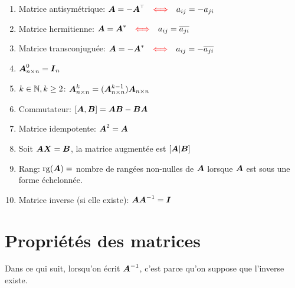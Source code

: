 \begin{adjmulticols}{1}{0in}{-2in}
\begin{enumerate}
\item Matrice antisymétrique: $\matA = -\transp{\matA}\quad{\color{red}\Longleftrightarrow}\quad a_{ij} = -a_{ji}$
\item Matrice hermitienne: $\boldsymbol{A} = \boldsymbol{A}^* \quad{\color{red}\Longleftrightarrow}\quad a_{ij} = \overline{a_{ji}}$
\item Matrice transconjuguée: $\boldsymbol{A} = -\boldsymbol{A}^* \quad{\color{red}\Longleftrightarrow}\quad a_{ij} = -\overline{a_{ji}}$
\item $\boldsymbol{A}_{n\times n}^0 = \boldsymbol{I}_n$
\item $k\in\mathbb{N}, k \geq 2$: \quad $\boldsymbol{A}^k_{n\times n} = (\boldsymbol{A}_{n\times n}^{k-1}) \boldsymbol{A}_{n\times n}$
\item Commutateur: $[\boldsymbol{A}, \boldsymbol{B}] = \boldsymbol{A}\boldsymbol{B} - \boldsymbol{B}\boldsymbol{A}$
\item Matrice idempotente: $\boldsymbol{A}^2 = \boldsymbol{A}$
\item Soit $\boldsymbol{A}\boldsymbol{X} = \boldsymbol{B}$, la matrice augmentée est $[\boldsymbol{A} |\boldsymbol{B}]$
\item Rang: $\operatorname{rg}(\boldsymbol{A}) = $ nombre de rangées non-nulles de $\boldsymbol{A}$ lorsque $\boldsymbol{A}$ est sous
une forme échelonnée.
\item Matrice inverse (si elle existe): $\boldsymbol{A} \boldsymbol{A}^{-1} = \boldsymbol{I}$
\end{enumerate}

\section{Propriétés des matrices}

Dans ce qui suit, lorsqu'on écrit $\boldsymbol{A}^{-1}$, c'est parce qu'on suppose que l'inverse existe.


\end{adjmulticols}
